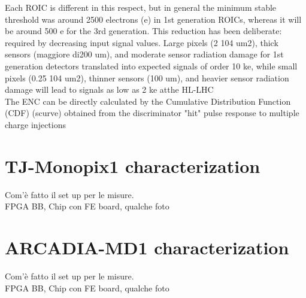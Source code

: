 Each ROIC is different in this respect, but in general the minimum stable threshold was around 2500 electrons (e) in 1st generation ROICs, whereas it will be around 500 e for the 3rd generation. This reduction has been deliberate: required by decreasing input signal values. Large pixels (2  104 um2), thick sensors (maggiore di200 um), and moderate sensor radiation damage for 1st generation detectors translated into expected signals of order 10 ke, while small pixels (0.25  104 um2), thinner sensors (100 um), and heavier sensor radiation damage will lead to signals as low as 2 ke atthe HL-LHC\\
The ENC can be directly calculated by the Cumulative Distribution Function (CDF) (scurve) obtained from the discriminator "hit" pulse response to multiple charge injections


\section{TJ-Monopix1 characterization}
Com'è fatto il set up per le misure.\\
FPGA BB, Chip con FE board, qualche foto\\

\section{ARCADIA-MD1 characterization}
Com'è fatto il set up per le misure.\\
FPGA BB, Chip con FE board, qualche foto\\